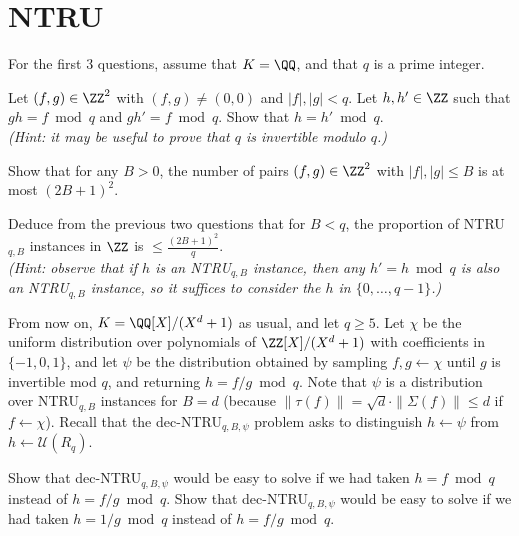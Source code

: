 \documentclass[11pt]{exam}
\theoremstyle{definition}
\begin{document}
\section{NTRU}

For the first 3 questions, assume that $K = \QQ$, and that $q$ is a prime integer.

\begin{questions}
\question Let $(f,g) \in \ZZ^2$ with $(f,g) \neq (0,0)$ and $|f|, |g| < q$. Let $h, h' \in \ZZ$ such that $gh = f \bmod q$ and $g h' = f \bmod q$. Show that $h = h' \bmod q$.\\
\textit{\color{gray}(Hint: it may be useful to prove that $q$ is invertible modulo $q$.)}

\question Show that for any $B > 0$, the number of pairs $(f,g) \in \ZZ^2$ with $|f|,|g| \leq B$ is at most $(2B+1)^2$.

\question Deduce from the previous two questions that for $B < q$, the proportion of NTRU$_{q,B}$ instances in $\ZZ$ is $\leq \frac{(2B+1)^2}{q}$.\\
\textit{\color{gray}(Hint: observe that if $h$ is an NTRU$_{q,B}$ instance, then any $h' = h \bmod q$ is also an NTRU$_{q,B}$ instance, so it suffices to consider the $h$ in $\{0,\dots, q-1\}$.)}
\end{questions}

From now on, $K = \QQ[X]/(X^d+1)$ as usual, and let $q \geq 5$. Let $\chi$ be the uniform distribution over polynomials of $\ZZ[X]/(X^d+1)$ with coefficients in $\{-1,0,1\}$, and let $\psi$ be the distribution obtained by sampling $f,g \leftarrow \chi$ until $g$ is invertible mod $q$, and returning $h = f/g \bmod q$. Note that $\psi$ is a distribution over NTRU$_{q,B}$ instances for $B = d$ (because $\|\tau(f)\| = \sqrt{d} \cdot \|\Sigma(f)\| \leq d$ if $f \leftarrow \chi$).
Recall that the dec-NTRU$_{q,B,\psi}$ problem asks to distinguish $h \leftarrow \psi$ from $h \leftarrow \mathcal{U}(R_q)$.
\begin{questions}
\question Show that dec-NTRU$_{q,B,\psi}$ would be easy to solve if we had taken $h = f \bmod q$ instead of $h = f/g \bmod q$.
\question Show that dec-NTRU$_{q,B,\psi}$ would be easy to solve if we had taken $h = 1/g \bmod q$ instead of $h = f/g \bmod q$.
\end{questions}
\end{document}
